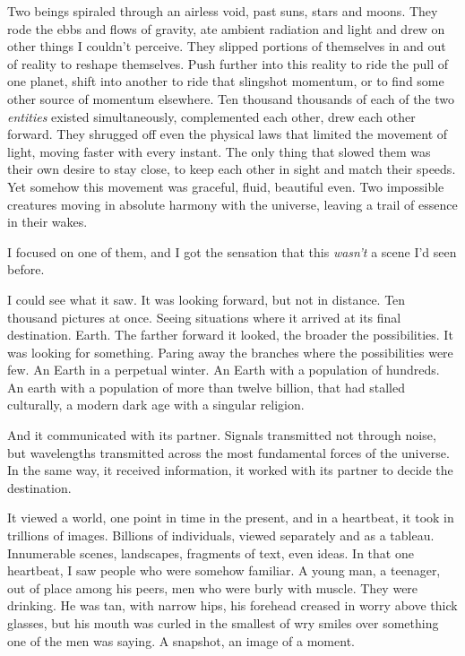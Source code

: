 Two beings spiraled through an airless void, past suns, stars and moons.  They rode the ebbs and flows of gravity, ate ambient radiation and light and drew on other things I couldn't perceive.  They slipped portions of themselves in and out of reality to reshape themselves.  Push further into this reality to ride the pull of one planet, shift into another to ride that slingshot momentum, or to find some other source of momentum elsewhere.  Ten thousand thousands of each of the two \emph{entities }existed simultaneously, complemented each other, drew each other forward.  They shrugged off even the physical laws that limited the movement of light, moving faster with every instant. The only thing that slowed them was their own desire to stay close, to keep each other in sight and match their speeds.  Yet somehow this movement was graceful, fluid, beautiful even.  Two impossible creatures moving in absolute harmony with the universe, leaving a trail of essence in their wakes.



I focused on one of them, and I got the sensation that this \emph{wasn't} a scene I'd seen before.



I could see what it saw.  It was looking forward, but not in distance.  Ten thousand pictures at once.  Seeing situations where it arrived at its final destination.  Earth.  The farther forward it looked, the broader the possibilities.  It was looking for something.  Paring away the branches where the possibilities were few.  An Earth in a perpetual winter.  An Earth with a population of hundreds.  An earth with a population of more than twelve billion, that had stalled culturally, a modern dark age with a singular religion.



And it communicated with its partner.  Signals transmitted not through noise, but wavelengths transmitted across the most fundamental forces of the universe.  In the same way, it received information, it worked with its partner to decide the destination.



It viewed a world, one point in time in the present, and in a heartbeat, it took in trillions of images.  Billions of individuals, viewed separately and as a tableau.  Innumerable scenes, landscapes, fragments of text, even ideas.  In that one heartbeat, I saw people who were somehow familiar.  A young man, a teenager, out of place among his peers, men who were burly with muscle.  They were drinking.  He was tan, with narrow hips, his forehead creased in worry above thick glasses, but his mouth was curled in the smallest of wry smiles over something one of the men was saying.  A snapshot, an image of a moment.



